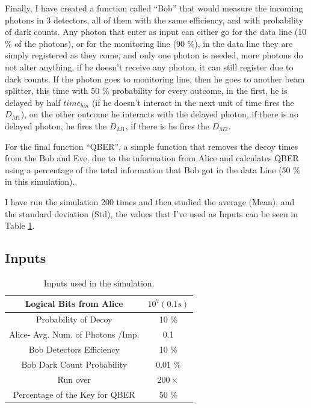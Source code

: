 \begin{refsection}
Finally, I have created a function called ``Bob'' that would measure the incoming photons in 3 detectors, all of them with the same efficiency, and with probability of dark counts. Any photon that enter as input can either go for the data line (10 \% of the photons), or for the monitoring line (90 \%), in the data line they are simply registered as they come, and only one photon is needed, more photons do not alter anything, if he doesn't receive any photon, it can still register due to dark counts. If the photon goes to monitoring line, then he goes to another beam splitter, this time with 50 \% probability for every outcome, in the first, he is delayed by half $time_{bin}$ (if he doesn't interact in the next unit of time fires the $D_{M1}$), on the other outcome he interacts with the delayed photon, if there is no delayed photon, he fires the $D_{M1}$, if there is he fires the $D_{M2}$.

For the final function ``QBER'', a simple function that removes the decoy times from the Bob and Eve, due to the information from Alice and calculates QBER using a percentage of the total information that Bob got in the data Line (50 \% in this simulation).

I have run the simulation 200 times and then studied the average (Mean), and the standard deviation (Std), the values that I've used as Inputs can be seen in Table \ref{Inputs}.

\subsection*{Inputs}

\begin{table}[hbt!]
	\centering
	\begin{tabular}{|c|c|}
		\hline
		Logical Bits from Alice & $10^{7} (0.1 s)$ \\ \hline
		Probability of Decoy & 10 \% \\ \hline
		Alice- Avg. Num. of Photons /Imp. & 0.1\\ \hline
		Bob Detectors Efficiency & 10 \% \\ \hline
		Bob Dark Count Probability & 0.01 \% \\ \hline
		Run over & $200 \times$\\ \hline
		Percentage of the Key for QBER & 50 \% \\ \hline
	\end{tabular}
	\caption{Inputs used in the simulation.}
	\label{Inputs}
\end{table}


\end{refsection}
